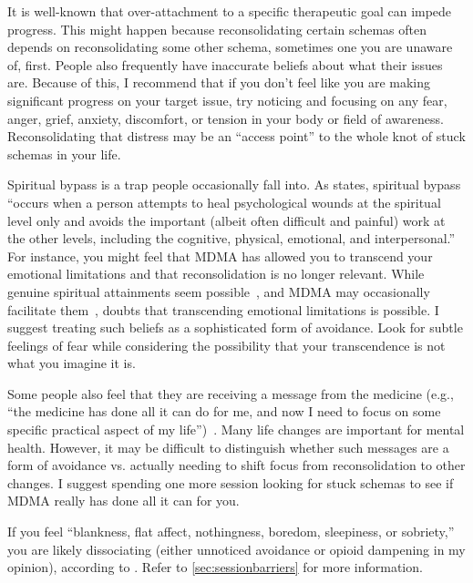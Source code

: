 \documentclass[11pt,oneside]{book}
\let\cite\parencite
\begin{document}
It is well-known that over-attachment to a specific therapeutic goal can impede progress. This might happen because reconsolidating certain schemas often depends on reconsolidating some other schema, sometimes one you are unaware of, first. People also frequently have inaccurate beliefs about what their issues are. Because of this, I recommend that if you don't feel like you are making significant progress on your target issue, try noticing and focusing on any fear, anger, grief, anxiety, discomfort, or tension in your body or field of awareness. Reconsolidating that distress may be an \enquote{access point} to the whole knot of stuck schemas in your life.

Spiritual bypass is a trap people occasionally fall into. As \textcite[sec. Spirituality and spiritual bypass defined]{cashwell2007Bypass} states, spiritual bypass \enquote{occurs when a person attempts to heal psychological wounds at the spiritual level only and avoids the important (albeit often difficult and painful) work at the other levels, including the cognitive, physical, emotional, and interpersonal.} For instance, you might feel that MDMA has allowed you to transcend your emotional limitations and that reconsolidation is no longer relevant. While genuine spiritual attainments seem possible~\cite{ingram2018mastering}, and MDMA may occasionally facilitate them~\cite{ingramMDMA}, \textcite{ingram2018mastering} doubts that transcending emotional limitations is possible. I suggest treating such beliefs as a sophisticated form of avoidance. Look for subtle feelings of fear while considering the possibility that your transcendence is not what you imagine it is.

Some people also feel that they are receiving a message from the medicine (e.g., \enquote{the medicine has done all it can do for me, and now I need to focus on some specific practical aspect of my life})~\cite{razviDissociation}. Many life changes are important for mental health. However, it may be difficult to distinguish whether such messages are a form of avoidance vs. actually needing to shift focus from reconsolidation to other changes. I suggest spending one more session looking for stuck schemas to see if MDMA really has done all it can for you.

If you feel \enquote{blankness, flat affect, nothingness, boredom, sleepiness, or sobriety,} you are likely dissociating (either unnoticed avoidance or opioid dampening in my opinion), according to \textcite[p. 14]{razviPSIP}. Refer to \cref{sec:sessionbarriers} for more information.
\end{document}
